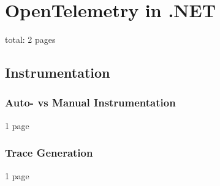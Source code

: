 \chapter{OpenTelemetry in .NET}
\label{chap:dotnet}

total: 2 pages

\section{Instrumentation}
\label{sec:d_instrumentation}

\subsection{Auto- vs Manual Instrumentation}

1 page

\subsection{Trace Generation}
\label{sec:d_trace_generation}

1 page
